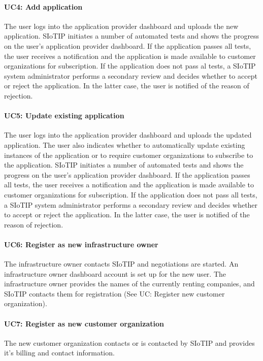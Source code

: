 \documentclass[english]{sareport}
\begin{document}
\paragraph{UC4: Add application}
The user logs into the application provider dashboard and uploads the new application. SIoTIP initiates a number of automated tests and shows the progress on the user's application provider dashboard. If the application passes all tests, the user receives a notification and the application is made available to customer organizations for subscription. If the application does not pass al tests, a SIoTIP system administrator performs a secondary review and decides whether to accept or reject the application. In the latter case, the user is notified of the reason of rejection.

\paragraph{UC5: Update existing application}
The user logs into the application provider dashboard and uploads the updated application. The user also indicates whether to automatically update existing instances of the application or to require customer organizations to subscribe to the application. SIoTIP initiates a number of automated tests and shows the progress on the user's application provider dashboard. If the application passes all tests, the user receives a notification and the application is made available to customer organizations for subscription. If the application does not pass all tests, a SIoTIP system administrator performs a secondary review and decides whether to accept or reject the application. In the latter case, the user is notified of the reason of rejection.

\paragraph{UC6: Register as new infrastructure owner}
The infrastructure owner contacts SIoTIP and negotiations are started. An infrastructure owner dashboard account is set up for the new user. The infrastructure owner provides the names of the currently renting companies, and SIoTIP contacts them for registration (See UC: Register new customer organization).

\paragraph{UC7: Register as new customer organization}
The new customer organization contacts or is contacted by SIoTIP and provides it's billing and contact information.
\end{document}
